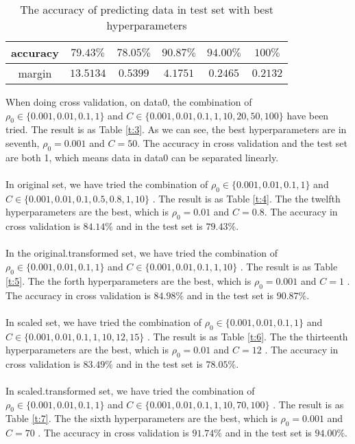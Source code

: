 \documentclass[12pt, fullpage,letterpaper]{article}
\begin{document}
\begin{enumerate}
\begin{table}[h]
\begin{tabular}{|c|c|c|c|c|c|}
  accuracy & $  79.43\%$ &$  78.05\% $ &  $90.87\%$   &   $94.00\%$   & $100\%$  \\
  \hline
  margin & $13.5134$&$0.5399$& $4.1751$ & $0.2465$ & $0.2132$ \\

      \hline
    \end{tabular}
    \caption{The accuracy of predicting data in test set with best hyperparameters}\label{t:2}
  \end{table}
 
  
 When doing cross validation, on data0, the combination of $\rho_0 \in \{0.001, 0.01, 0.1, 1\}$ and  $C \in \{0.001, 0.01, 0.1, 1, 10, 20, 50, 100\}$ have been tried. The result is as Table \ref{t:3}. As we can see, the best hyperparameters are in seventh, $\rho_0=0.001$ and $C=50$. The accuracy in cross validation and the test set are both 1, which means data in data0 can be separated linearly.\\
 \\
 In original set, we have tried the combination of $\rho_0 \in \{0.001, 0.01, 0.1, 1\}$ and  $C \in \{0.001, 0.01, 0.1, 0.5, 0.8, 1, 10\}$ . The result is as Table \ref{t:4}. The the twelfth hyperparameters are the best, which is $\rho_0=0.01$ and $C=0.8$. The accuracy in cross validation is $84.14\%$ and in the test set is $79.43\%$.\\
 \\
  In the original.transformed set, we have tried the combination of $\rho_0 \in \{0.001, 0.01, 0.1, 1\}$ and  $C \in \{0.001, 0.01, 0.1, 1, 10\}$ . The result is as Table \ref{t:5}. The the forth hyperparameters are the best, which is $\rho_0=0.001$ and $C=1$ . The accuracy in cross validation is $84.98\%$ and in the test set is $90.87\%$.\\
  \\
   In scaled set, we have tried the combination of $\rho_0 \in \{0.001, 0.01, 0.1, 1\}$ and  $C \in \{0.001, 0.01, 0.1, 1, 10, 12, 15\}$ . The result is as Table \ref{t:6}. The the thirteenth hyperparameters are the best, which is $\rho_0=0.01$ and $C=12$ . The accuracy in cross validation is $83.49\%$ and in the test set is $78.05\%$.\\
\\
  In scaled.transformed set, we have tried the combination of $\rho_0 \in \{0.001, 0.01, 0.1, 1\}$ and  $C \in \{0.001, 0.01, 0.1, 1, 10, 70, 100\}$ . The result is as Table \ref{t:7}. The the sixth hyperparameters are the best, which is $\rho_0=0.001$ and $C=70$ . The accuracy in cross validation is $91.74\%$ and in the test set is $94.00\%$.\\



\end{enumerate}
\end{document}

